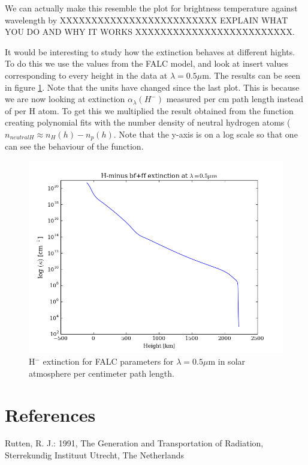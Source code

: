 \documentclass{aa}   %
\begin{document}
We can actually make this resemble the plot for brightness temperature against wavelength by XXXXXXXXXXXXXXXXXXXXXXXXX EXPLAIN WHAT YOU DO  AND WHY IT WORKS XXXXXXXXXXXXXXXXXXXXXXXXX.

It would be interesting to study how the extinction behaves at different hights.
To do this we use the values from the FALC model, and look at insert values corresponding to every height in the data at $\lambda = 0.5 \mu$m. The results can be seen in figure \ref{falc_extinc}. Note that the units have changed since the last plot. This is because we are now looking at extinction $\alpha_\lambda(H^-)$ measured per cm path length instead of per H atom. To get this we multiplied the result obtained from the function creating polynomial fits with the number density of neutral hydrogen atoms ($n_{neutral H} \approx n_H(h) - n_p(h)$. Note that the y-axis is on a log scale so that one can see the behaviour of the function.
\begin{figure}
 \includegraphics[width=.49\textwidth]{falc_extinc.png}
 \caption{H$^-$ extinction for FALC parameters for $\lambda = 0.5\mu$m in solar atmosphere per centimeter path length.}
 \label{falc_extinc} 
\end{figure}



\section{References}
Rutten, R. J.: 1991, The Generation and Transportation of Radiation, Sterrekundig Instituut Utrecht, The Netherlands

\end{document}
